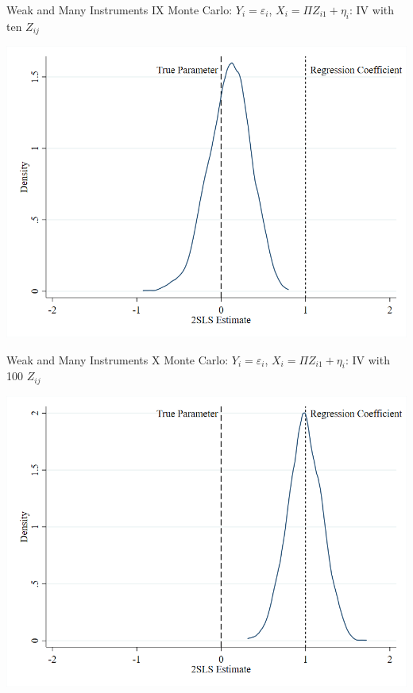 \documentclass{beamer}
\begin{document}
\begin{frame}{Weak and Many Instruments IX}
Monte Carlo: $Y_i=\varepsilon_i$, $X_i=\Pi Z_{i1}+\eta_i$: IV with ten $Z_{ij}$
\begin{center}
\includegraphics[scale=0.35]{./lecture_includes/somez.png}
\end{center}

\end{frame}

\begin{frame}{Weak and Many Instruments X}
Monte Carlo: $Y_i=\varepsilon_i$, $X_i=\Pi Z_{i1}+\eta_i$: IV with 100 $Z_{ij}$
\begin{center}
\includegraphics[scale=0.35]{./lecture_includes/manyz.png}
\end{center}

\end{frame}
\end{document}
